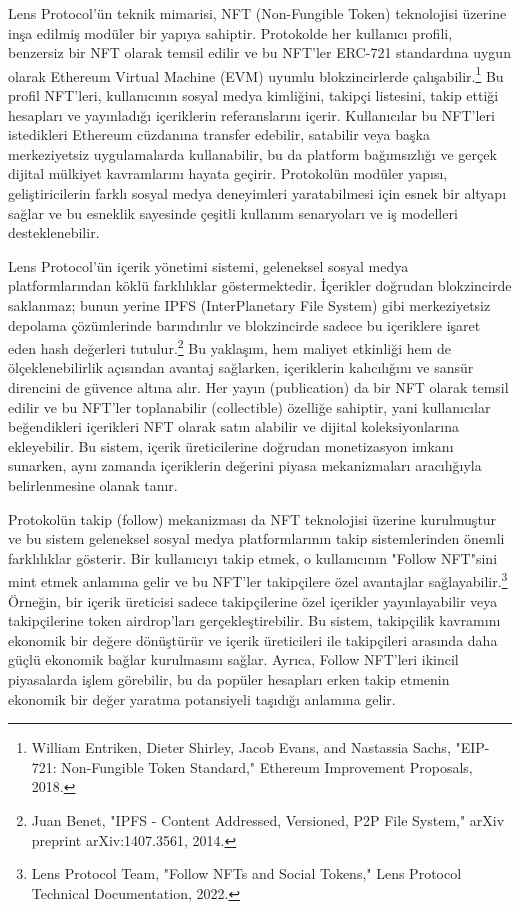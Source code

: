 \documentclass[11pt,a4paper]{article}
\begin{document}
Lens Protocol'ün teknik mimarisi, NFT (Non-Fungible Token) teknolojisi üzerine inşa edilmiş modüler bir yapıya sahiptir. Protokolde her kullanıcı profili, benzersiz bir NFT olarak temsil edilir ve bu NFT'ler ERC-721 standardına uygun olarak Ethereum Virtual Machine (EVM) uyumlu blokzincirlerde çalışabilir.\footnote{William Entriken, Dieter Shirley, Jacob Evans, and Nastassia Sachs, "EIP-721: Non-Fungible Token Standard," Ethereum Improvement Proposals, 2018.} Bu profil NFT'leri, kullanıcının sosyal medya kimliğini, takipçi listesini, takip ettiği hesapları ve yayınladığı içeriklerin referanslarını içerir. Kullanıcılar bu NFT'leri istedikleri Ethereum cüzdanına transfer edebilir, satabilir veya başka merkeziyetsiz uygulamalarda kullanabilir, bu da platform bağımsızlığı ve gerçek dijital mülkiyet kavramlarını hayata geçirir. Protokolün modüler yapısı, geliştiricilerin farklı sosyal medya deneyimleri yaratabilmesi için esnek bir altyapı sağlar ve bu esneklik sayesinde çeşitli kullanım senaryoları ve iş modelleri desteklenebilir.

Lens Protocol'ün içerik yönetimi sistemi, geleneksel sosyal medya platformlarından köklü farklılıklar göstermektedir. İçerikler doğrudan blokzincirde saklanmaz; bunun yerine IPFS (InterPlanetary File System) gibi merkeziyetsiz depolama çözümlerinde barındırılır ve blokzincirde sadece bu içeriklere işaret eden hash değerleri tutulur.\footnote{Juan Benet, "IPFS - Content Addressed, Versioned, P2P File System," arXiv preprint arXiv:1407.3561, 2014.} Bu yaklaşım, hem maliyet etkinliği hem de ölçeklenebilirlik açısından avantaj sağlarken, içeriklerin kalıcılığını ve sansür direncini de güvence altına alır. Her yayın (publication) da bir NFT olarak temsil edilir ve bu NFT'ler toplanabilir (collectible) özelliğe sahiptir, yani kullanıcılar beğendikleri içerikleri NFT olarak satın alabilir ve dijital koleksiyonlarına ekleyebilir. Bu sistem, içerik üreticilerine doğrudan monetizasyon imkanı sunarken, aynı zamanda içeriklerin değerini piyasa mekanizmaları aracılığıyla belirlenmesine olanak tanır.

Protokolün takip (follow) mekanizması da NFT teknolojisi üzerine kurulmuştur ve bu sistem geleneksel sosyal medya platformlarının takip sistemlerinden önemli farklılıklar gösterir. Bir kullanıcıyı takip etmek, o kullanıcının "Follow NFT"sini mint etmek anlamına gelir ve bu NFT'ler takipçilere özel avantajlar sağlayabilir.\footnote{Lens Protocol Team, "Follow NFTs and Social Tokens," Lens Protocol Technical Documentation, 2022.} Örneğin, bir içerik üreticisi sadece takipçilerine özel içerikler yayınlayabilir veya takipçilerine token airdrop'ları gerçekleştirebilir. Bu sistem, takipçilik kavramını ekonomik bir değere dönüştürür ve içerik üreticileri ile takipçileri arasında daha güçlü ekonomik bağlar kurulmasını sağlar. Ayrıca, Follow NFT'leri ikincil piyasalarda işlem görebilir, bu da popüler hesapları erken takip etmenin ekonomik bir değer yaratma potansiyeli taşıdığı anlamına gelir.
\end{document}
